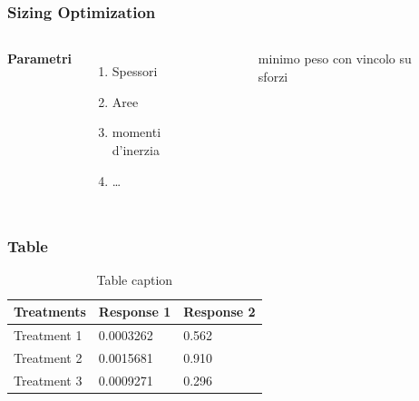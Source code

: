 \documentclass{beamer}
\begin{document}
\begin{frame}
	\frametitle{Sizing Optimization}
	\begin{columns}[c] %
		
		\textbf{Parametri}
		\begin{enumerate}
			\item Spessori
			\item Aree
			\item momenti d'inerzia
			\item \ldots
		\end{enumerate}
		
		\begin{figure}
			\centering
			\caption[]{minimo peso con vincolo su sforzi}
			\label{fig:pc}
		\end{figure}
	\end{columns}
\end{frame}




























\begin{frame}
	\frametitle{Table}
	\begin{table}
		\begin{tabular}{l l l}
			\toprule
			\textbf{Treatments} & \textbf{Response 1} & \textbf{Response 2}\\
			\midrule
			Treatment 1 & 0.0003262 & 0.562 \\
			Treatment 2 & 0.0015681 & 0.910 \\
			Treatment 3 & 0.0009271 & 0.296 \\
			\bottomrule
		\end{tabular}
		\caption{Table caption}
	\end{table}
\end{frame}
\end{document}
